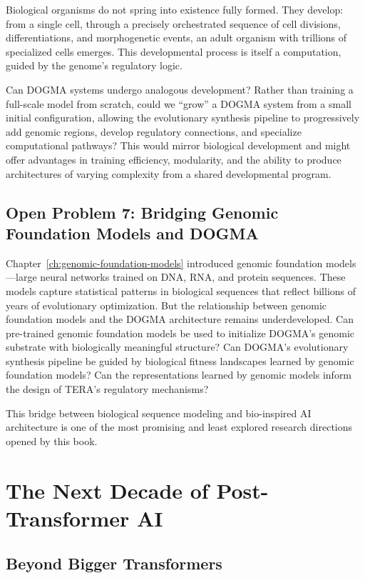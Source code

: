 Biological organisms do not spring into existence fully formed. They develop: from a single cell, through a precisely orchestrated sequence of cell divisions, differentiations, and morphogenetic events, an adult organism with trillions of specialized cells emerges. This developmental process is itself a computation, guided by the genome's regulatory logic.

Can DOGMA systems undergo analogous development? Rather than training a full-scale model from scratch, could we ``grow'' a DOGMA system from a small initial configuration, allowing the evolutionary synthesis pipeline to progressively add genomic regions, develop regulatory connections, and specialize computational pathways? This would mirror biological development and might offer advantages in training efficiency, modularity, and the ability to produce architectures of varying complexity from a shared developmental program.

\subsection{Open Problem 7: Bridging Genomic Foundation Models and DOGMA}

Chapter~\ref{ch:genomic-foundation-models} introduced genomic foundation models---large neural networks trained on DNA, RNA, and protein sequences. These models capture statistical patterns in biological sequences that reflect billions of years of evolutionary optimization. But the relationship between genomic foundation models and the DOGMA architecture remains underdeveloped. Can pre-trained genomic foundation models be used to initialize DOGMA's genomic substrate with biologically meaningful structure? Can DOGMA's evolutionary synthesis pipeline be guided by biological fitness landscapes learned by genomic foundation models? Can the representations learned by genomic models inform the design of TERA's regulatory mechanisms?

This bridge between biological sequence modeling and bio-inspired AI architecture is one of the most promising and least explored research directions opened by this book.

\section{The Next Decade of Post-Transformer AI}
\label{sec:next-decade}

\subsection{Beyond Bigger Transformers}

